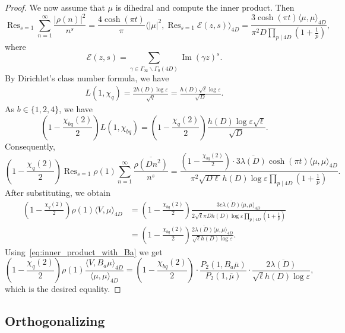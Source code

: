 \documentclass[11pt,reqno,oneside]{amsart}
\theoremstyle{plain}
\theoremstyle{definition}
\DeclareMathOperator{\im}{Im}
\DeclareMathOperator*{\Res}{Res}
\begin{document}
\begin{proof}
  We now assume that $\mu$ is dihedral and compute the inner product.
  Then
  \[
    \Res_{s=1} \sum_{n=1}^{\infty} \frac{|\rho(n)|^2}{n^s}
    = \frac{4 \cosh(\pi t)}{\pi}
    \langle |\mu|^2, \Res_{s=1} \mathcal{E}(z,s)
    \rangle_{4D}
    = \frac{3 \cosh(\pi t) \langle \mu, \mu \rangle_{4D}}{\pi^2 D \prod_{p
        \mid 4D} (1 + \tfrac{1}{p})},
  \]
  where
  \[
    \mathcal{E}(z,s)
    = \sum_{\gamma \in \Gamma_{\infty} \backslash \Gamma_0(4D)} \im(\gamma z)^s.
  \]
  By Dirichlet's class number formula, we have
  \begin{align}\label{eq:class-number-formula}
    L(1, \chi_{q}) = \frac{2 h(D) \log \varepsilon}{\sqrt{q}}
    = \frac{h(D) \sqrt{\ell} \log \varepsilon }{\sqrt{D}}.
  \end{align}
  As $b \in \{1, 2, 4\}$, we have
  \[
    \left( 1 - \frac{\chi_{bq}(2)}{2} \right)
    L(1, \chi_{bq}) = \left( 1 - \frac{\chi_{q}(2)}{2} \right)
    \frac{ h(D) \log \varepsilon \sqrt{\ell}}{\sqrt{D}}.
  \]
  Consequently,
  \[
    \left( 1 - \frac{\chi_{q}(2)}{2} \right) \Res_{s=1} \rho(1) \sum_{n=1}^{\infty} \frac{\overline{\rho(Dn^2)}}{n^s}
    = %
    \frac{(1-\frac{\chi_{bq}(2)}{2}) \cdot 3 \overline{\lambda(D)} \cosh(\pi t) \langle \mu, \mu \rangle_{4D}}
    {\pi^2 \sqrt{D\ell} h(D) \log \varepsilon \prod_{p \mid 4D} (1 + \tfrac{1}{p})}.
  \]
  After substituting, we obtain
  \begin{align*}
    \left( 1 - \frac{\chi_{q}(2)}{2} \right) \rho(1) \langle V, \mu \rangle_{4D}
     & = \left( 1 - \frac{\chi_{bq}(2)}{2} \right) \frac{3c \overline{\lambda(D)} \langle \mu, \mu \rangle_{4D}}
    {2 \sqrt{\ell} \pi D h(D) \log \varepsilon \prod_{p \mid 4D} (1 + \tfrac{1}{p})}                              \\
     & = \left( 1 - \frac{\chi_{bq}(2)}{2} \right) \frac{  2 \overline{\lambda(D)} \langle \mu, \mu \rangle_{4D}}
    { \sqrt{\ell} h(D) \log \varepsilon}.
  \end{align*}
  Using~\eqref{eq:inner_product_with_Ba} we get
  \[
    \left( 1 - \frac{\chi_{q}(2)}{2} \right) \rho(1) \frac{\langle V, B_a \mu
      \rangle_{4D}}{\langle \mu, \mu \rangle_{4D}}
    =  \left( 1 - \frac{\chi_{bq}(2)}{2} \right) \cdot \frac{P_2(1, B_a \overline{\mu})}{P_2(1, \overline{\mu})} \cdot \frac{ 2 \overline{\lambda(D)}}
    {\sqrt{\ell} h(D) \log \varepsilon},
  \]
  which is the desired equality.
\end{proof}


\subsection{Orthogonalizing}\label{ssec:orth}
\end{document}
